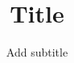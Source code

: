 \documentclass[paper=a4, 12pt,oneside]{scrbook}
\title{Title}
\subtitle{Add subtitle}
\begin{document}
\frontmatter
\maketitle

\affidavit

\tableofcontents

\mainmatter







\end{document}
